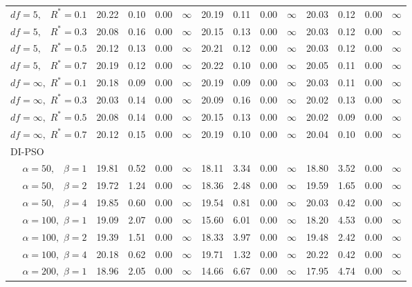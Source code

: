 \documentclass[12pt]{article}
\begin{document}
\begin{table}[ht]
{\begin{tabular}{r|rrrr|rrrr|rrrr}
  $df = 5,\enspace$ $R^* =0.1$ & 20.22 & 0.10 & 0.00 & $\infty$ & 20.19 & 0.11 & 0.00 & $\infty$ & 20.03 & 0.12 & 0.00 & $\infty$ \\ 
  $df = 5,\enspace$ $R^* =0.3$ & 20.08 & 0.16 & 0.00 & $\infty$ & 20.15 & 0.13 & 0.00 & $\infty$ & 20.03 & 0.12 & 0.00 & $\infty$ \\ 
  $df = 5,\enspace$ $R^* =0.5$ & 20.12 & 0.13 & 0.00 & $\infty$ & 20.21 & 0.12 & 0.00 & $\infty$ & 20.03 & 0.12 & 0.00 & $\infty$ \\ 
  $df = 5,\enspace$ $R^* =0.7$ & 20.19 & 0.12 & 0.00 & $\infty$ & 20.22 & 0.10 & 0.00 & $\infty$ & 20.05 & 0.11 & 0.00 & $\infty$ \\ 
  $df = \infty,$ $R^* =0.1$ & 20.18 & 0.09 & 0.00 & $\infty$ & 20.19 & 0.09 & 0.00 & $\infty$ & 20.03 & 0.11 & 0.00 & $\infty$ \\ 
  $df = \infty,$ $R^* =0.3$ & 20.03 & 0.14 & 0.00 & $\infty$ & 20.09 & 0.16 & 0.00 & $\infty$ & 20.02 & 0.13 & 0.00 & $\infty$ \\ 
  $df = \infty,$ $R^* =0.5$ & 20.08 & 0.14 & 0.00 & $\infty$ & 20.15 & 0.13 & 0.00 & $\infty$ & 20.02 & 0.09 & 0.00 & $\infty$ \\ 
  $df = \infty,$ $R^* =0.7$ & 20.12 & 0.15 & 0.00 & $\infty$ & 20.19 & 0.10 & 0.00 & $\infty$ & 20.04 & 0.10 & 0.00 & $\infty$ \\ 
\hline
\multicolumn{1}{l|}{DI-PSO} &&&&&&&&&&&&\\
  $\alpha = 50,\enspace$ $\beta =1$ & 19.81 & 0.52 & 0.00 & $\infty$ & 18.11 & 3.34 & 0.00 & $\infty$ & 18.80 & 3.52 & 0.00 & $\infty$ \\ 
  $\alpha = 50,\enspace$ $\beta =2$ & 19.72 & 1.24 & 0.00 & $\infty$ & 18.36 & 2.48 & 0.00 & $\infty$ & 19.59 & 1.65 & 0.00 & $\infty$ \\ 
  $\alpha = 50,\enspace$ $\beta =4$ & 19.85 & 0.60 & 0.00 & $\infty$ & 19.54 & 0.81 & 0.00 & $\infty$ & 20.03 & 0.42 & 0.00 & $\infty$ \\ 
  $\alpha = 100,$ $\beta =1$ & 19.09 & 2.07 & 0.00 & $\infty$ & 15.60 & 6.01 & 0.00 & $\infty$ & 18.20 & 4.53 & 0.00 & $\infty$ \\ 
  $\alpha = 100,$ $\beta =2$ & 19.39 & 1.51 & 0.00 & $\infty$ & 18.33 & 3.97 & 0.00 & $\infty$ & 19.48 & 2.42 & 0.00 & $\infty$ \\ 
  $\alpha = 100,$ $\beta =4$ & 20.18 & 0.62 & 0.00 & $\infty$ & 19.71 & 1.32 & 0.00 & $\infty$ & 20.22 & 0.42 & 0.00 & $\infty$ \\ 
  $\alpha = 200,$ $\beta =1$ & 18.96 & 2.05 & 0.00 & $\infty$ & 14.66 & 6.67 & 0.00 & $\infty$ & 17.95 & 4.74 & 0.00 & $\infty$ \\ 

\end{tabular}}
\end{table}
\end{document}
